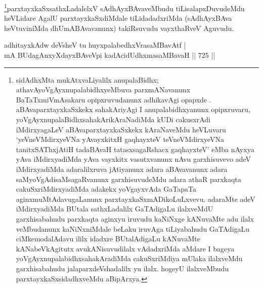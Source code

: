 \begin{artha}
\footnote{sidAdhxMta mukAtxvaLiyalilx anupalaBidhx; athavAyoVgAyxnupalabidhxyeMbuva parxmANavanunx BaTaTxmiVmAsakaru opipxruvudanunx adhikavAgi opapxde . aBAvaparxtayxkaSxkekx sahakAriyAgi I anupalabidhxyanunx opipxruvaru, yoVgAyxnupalaBidhxsahakArikAraNadiMda kUDi cakusxrAdi iMdirxyagaLeV aBAvaparxtayxkaSxkekx  kAraNaveMdu heVLuvaru `yeVneVMdirxyeVNa yAvayxkitxH gaqhayxteV teVneVMdirxyeVNa tanitxSAThxjAtiH tadaBAvaH tatasxsagaRshacx gaqhayxteV' eMba nAyxya yAva iMdirxyadiMda yAva vayxkitx vasutxvanunx nAvu garxhisuvevo adeV iMdirxyadiMda adaralilxruva jAtiyanunx adara aBAvavanunx adara saMyoVgAdisaMsagaRvanunx garxhisuvudeMdu adara athaR parxkaqta cakuSxriMdirxyadiMda adakekx yoVgayxvAda GaTapaTa aginxmuMtAdavugaLanunx parxtayxkaSxmADikoLuLxvevu. adaraMte adeV iMdirxyadiMda BUtala sathxLadalilx GaTAdigaLu ilalxveMdU garxhisabahudu parxkaqta aginxyu iruvudu kaNiNxge kANuvaMte adu ilalx veMbudanunx kaNiNxniMdale beLaku iruvAga tiLiyabahudu  GaTAdigaLu ciMkemodalAdavu ililx idadxre BUtalAdigaLu kANuvaMte kANabeVkAgitutx avukANisuvudilalx vAdadxriMda aMdare I bageya yoVgAyxnupalabidhxsahakAradiMda cakuSxriMdiya mUlaka ilalxveMdu garxhisabahudu jalaparxdeVshadalilx yu ilalx. hogeyU ilalxveMbudu parxtayxkaSxsidadhxveMdu aBipArxya.}parxtayxkaSxsathxLadalelxV sAdhAyxBAvaveMbudu tiLisalapxDuvudeMdu heVLidare AgalU parxtayxkaSxdiMdale tiLidadadxriMda (sAdhAyxBAva heVtuviniMda dhUmABAvavanunx) takiRsuvudu vayxthaRveV Aguvudu.
\end{artha}

\begin{shl}
\footnotemark[1]adhitayxkAdw deVsheV tu huyxpalabedhxVrasaMBavAtf | \\
mA BUdagAnxyXdayxBAveV\s pi kadAcidUdhxmasaMBavaH \hfill||  725 ||  
\end{shl}


